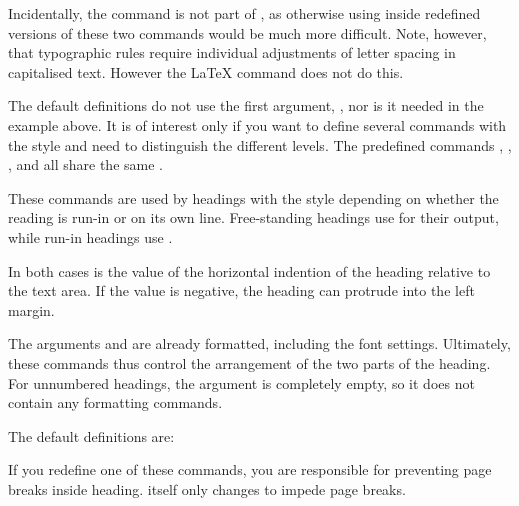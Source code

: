 Incidentally, the  command is not part of
, as otherwise using  inside redefined
versions of these two commands would be much more difficult. Note, however,
that typographic rules require individual adjustments of letter spacing in
capitalised text. However the \LaTeX{}  command does not
do this.

The default definitions do not use the first argument, , nor is
it needed in the example above. It is of interest only if you want to define
several commands with the  style and need to distinguish the
different levels. The predefined commands ,
, , and
 all share the same 
.%
\EndIndexGroup


\begin{Declaration}
\end{Declaration}
These commands are used by headings with the 
style depending on whether the reading is run-in or on its own line.
Free-standing headings use  for their output, while
run-in headings use .

In both cases  is the value of the horizontal indention of the
heading relative to the text area. If the value is negative, the heading can
protrude into the left margin.

The arguments  and  are already formatted, including
the font settings. Ultimately, these commands thus control the arrangement of
the two parts of the heading. For unnumbered headings, the 
argument is completely empty, so it does not contain any formatting commands.

The default definitions are:
\begin{lstcode}
\newcommand{\sectionlinesformat}[4]{%
  \@hangfrom{\hskip #2#3}{#4}%
}
\newcommand{\sectioncatchphraseformat}[4]{%
  \hskip #2#3#4%
}
\end{lstcode}

If you redefine one of these commands, you are responsible for preventing page
breaks inside heading. \KOMAScript{} itself only changes
 to impede page breaks.

